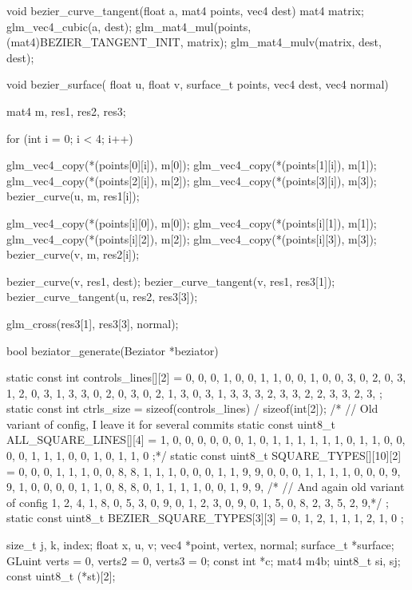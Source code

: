 \begin{multicols}{2}
\begin{ccode}
void bezier_curve_tangent(float a, mat4 points, vec4 dest) {
    mat4 matrix;
    glm_vec4_cubic(a, dest);
    glm_mat4_mul(points, (mat4)BEZIER_TANGENT_INIT, matrix);
    glm_mat4_mulv(matrix, dest, dest);
}

void bezier_surface(
        float u, float v, surface_t points, vec4 dest, vec4 normal) {
    mat4 m, res1, res2, res3;

    for (int i = 0; i < 4; i++) {
        glm_vec4_copy(*(points[0][i]), m[0]);
        glm_vec4_copy(*(points[1][i]), m[1]);
        glm_vec4_copy(*(points[2][i]), m[2]);
        glm_vec4_copy(*(points[3][i]), m[3]);
        bezier_curve(u, m, res1[i]);

        glm_vec4_copy(*(points[i][0]), m[0]);
        glm_vec4_copy(*(points[i][1]), m[1]);
        glm_vec4_copy(*(points[i][2]), m[2]);
        glm_vec4_copy(*(points[i][3]), m[3]);
        bezier_curve(v, m, res2[i]);
    }

    bezier_curve(v, res1, dest);
    bezier_curve_tangent(v, res1, res3[1]);
    bezier_curve_tangent(u, res2, res3[3]);

    glm_cross(res3[1], res3[3], normal);
}

bool beziator_generate(Beziator *beziator) {
    static const int controls_lines[][2] = {
        {0, 0}, {0, 1}, {0, 0}, {1, 1}, {0, 0}, {1, 0},
        {0, 3}, {0, 2}, {0, 3}, {1, 2}, {0, 3}, {1, 3},
        {3, 0}, {2, 0}, {3, 0}, {2, 1}, {3, 0}, {3, 1},
        {3, 3}, {3, 2}, {3, 3}, {2, 2}, {3, 3}, {2, 3},
    };
    static const int ctrls_size = sizeof(controls_lines) / sizeof(int[2]);
    /* // Old variant of config, I leave it for several commits
    static const uint8_t ALL_SQUARE_LINES[][4] = {
        {1, 0, 0, 0}, {0, 0, 0, 1}, {0, 1, 1, 1}, {1, 1, 1, 0},
        {1, 1, 0, 0}, {0, 0, 1, 1}, {1, 0, 0, 1}, {0, 1, 1, 0}
    };*/
    static const uint8_t SQUARE_TYPES[][10][2] = {
        {{0, 0}, {0, 1}, {1, 1}, {0, 0}, {8, 8},
         {1, 1}, {1, 0}, {0, 0}, {1, 1}, {9, 9}},
        {{0, 0}, {0, 1}, {1, 1}, {1, 0}, {0, 0}, {9, 9}},
        {{1, 0}, {0, 0}, {0, 1}, {1, 0}, {8, 8},
         {0, 1}, {1, 1}, {1, 0}, {0, 1}, {9, 9}},
        /* // And again old variant of config
        {1, 2, 4, 1, 8, 0, 5, 3, 0, 9},
        {0, 1, 2, 3, 0, 9},
        {0, 1, 5, 0, 8, 2, 3, 5, 2, 9},*/
    };
    static const uint8_t BEZIER_SQUARE_TYPES[3][3] = {
        {0, 1, 2}, {1, 1, 1}, {2, 1, 0}
    };

    size_t j, k, index;
    float x, u, v;
    vec4 *point, vertex, normal;
    surface_t *surface;
    GLuint verts = 0, verts2 = 0, verts3 = 0;
    const int *c;
    mat4 m4b;
    uint8_t si, sj;
    const uint8_t (*st)[2];

}
\end{ccode}
\end{multicols}
